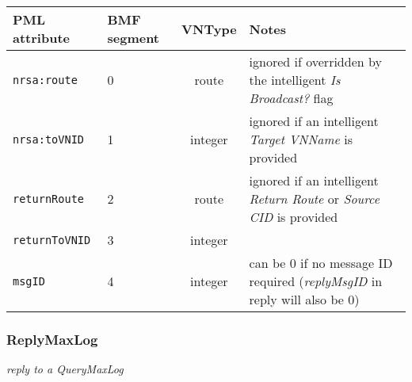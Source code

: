 \documentclass[pdftex,a4paper]{article}
\newcommand{\XMLfont}[1]{{\tt \small #1}}
\begin{document}
\begin{table}[!h]
  \begin{center}
    \label{tab:QueryMaxLog}
    \begin{tabular}{|l|p{13mm}|c|p{60mm}|}
      \hline

      \textbf{PML attribute} & \textbf{BMF segment} & \textbf{VNType}
      & \textbf{Notes} \\\hline

      \XMLfont{nrsa:route} & 0 & route & ignored if overridden by the
      intelligent {\em Is Broadcast?} flag \\\hline

      \XMLfont{nrsa:toVNID} & 1 & integer & ignored if an intelligent {\em
      Target VNName} is provided \\\hline

      \XMLfont{returnRoute} & 2 & route & ignored if an
      intelligent {\em Return Route} or {\em Source CID} is provided
      \\\hline

      \XMLfont{returnToVNID} & 3 & integer & \\\hline

      \XMLfont{msgID} & 4 & integer & can be 0 if no message ID
      required ({\em replyMsgID} in reply will also be 0) \\\hline

    \end{tabular}
  \end{center}
\end{table}

\subsubsection{ReplyMaxLog}

{\em reply to a QueryMaxLog}
\end{document}
